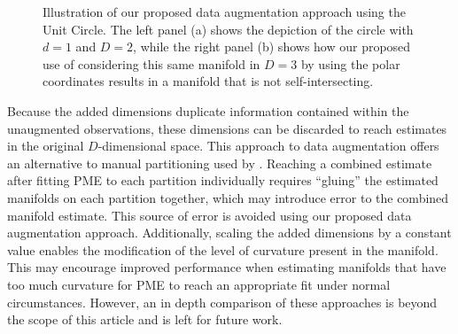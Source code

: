 \documentclass[12pt]{article}
\theoremstyle{definition}
\begin{document}
\begin{figure}
  \centering
  \hfill
  \caption{{\footnotesize Illustration of our proposed data augmentation approach using the Unit Circle. The left panel (a) shows the depiction of the circle with $d=1$ and $D=2$, while the right panel (b) shows how our proposed use of considering this same manifold in $D=3$ by using the polar coordinates results in a manifold that is not self-intersecting.}}
  \label{fig:unit_circle_augmentation}
\end{figure}

Because the added dimensions duplicate information contained within the unaugmented observations, these dimensions can be discarded to reach estimates in the original $D$-dimensional space. This approach to data augmentation offers an alternative to manual partitioning used by \cite{mengPrincipalManifoldEstimation2021}. Reaching a combined estimate after fitting PME to each partition individually requires ``gluing'' the estimated manifolds on each partition together, which may introduce error to the combined manifold estimate. This source of error is avoided using our proposed data augmentation approach. Additionally, scaling the added dimensions by a constant value enables the modification of the level of curvature present in the manifold. This may encourage improved performance when estimating manifolds that have too much curvature for PME to reach an appropriate fit under normal circumstances. However, an in depth comparison of these approaches is beyond the scope of this article and is left for future work.
\end{document}
